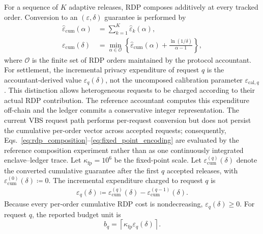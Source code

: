 \documentclass[10pt,journal,compsoc]{IEEEtran}
\begin{document}
For a sequence of $K$ adaptive releases, RDP composes additively at every tracked order. Conversion to an $(\varepsilon,\delta)$ guarantee is performed by
\begin{equation}
\begin{aligned}
\widehat{\varepsilon}_{\mathrm{cum}}(\alpha)
&=
\sum_{k=1}^{K}
\widehat{\varepsilon}_{k}(\alpha),\\
\varepsilon_{\mathrm{cum}}(\delta)
&=
\min_{\alpha\in\mathcal{O}}
\left\{
\widehat{\varepsilon}_{\mathrm{cum}}(\alpha)
+
\frac{
\ln(1/\delta)
}{
\alpha-1
}
\right\},
\end{aligned}
\label{eq:rdp_composition}
\end{equation}
where $\mathcal{O}$ is the finite set of RDP orders maintained by the protocol accountant. For settlement, the incremental privacy expenditure of request $q$ is the accountant-derived value $\varepsilon_q(\delta)$, not the uncomposed calibration parameter $\varepsilon_{\mathrm{cal},q}$. This distinction allows heterogeneous requests to be charged according to their actual RDP contribution. The reference accountant computes this expenditure off-chain and the ledger commits a conservative integer representation. The current VBS request path performs per-request conversion but does not persist the cumulative per-order vector across accepted requests; consequently, Eqs.~\eqref{eq:rdp_composition}--\eqref{eq:fixed_point_encoding} are evaluated by the reference composition experiment rather than as one continuously integrated enclave--ledger trace. Let $\kappa_{\mathrm{fp}}=10^6$ be the fixed-point scale. Let $\varepsilon_{\mathrm{cum}}^{(q)}(\delta)$ denote the converted cumulative guarantee after the first $q$ accepted releases, with $\varepsilon_{\mathrm{cum}}^{(0)}(\delta)\coloneqq0$. The incremental expenditure charged to request $q$ is
\begin{equation}
\begin{aligned}
\varepsilon_q(\delta)
\coloneqq
\varepsilon_{\mathrm{cum}}^{(q)}(\delta) - \varepsilon_{\mathrm{cum}}^{(q-1)}(\delta).
\end{aligned}
\end{equation}
Because every per-order cumulative RDP cost is nondecreasing, $\varepsilon_q(\delta)\geq0$. For request $q$, the reported budget unit is
\begin{equation}
b_q
=
\left\lceil
\kappa_{\mathrm{fp}}
\varepsilon_q(\delta)
\right\rceil.
\label{eq:fixed_point_encoding}
\end{equation}
\end{document}
